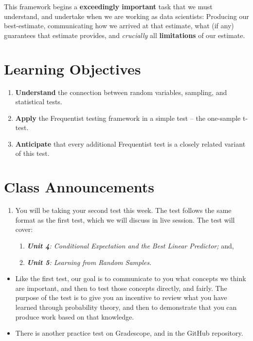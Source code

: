 \documentclass[
]{book}
\providecommand{\tightlist}{%
  \setlength{\itemsep}{0pt}\setlength{\parskip}{0pt}}
\theoremstyle{definition}
\theoremstyle{definition}
\theoremstyle{definition}
\theoremstyle{definition}
\theoremstyle{remark}
\begin{document}
This framework begins a \textbf{exceedingly important} task that we must understand, and undertake when we are working as data scientists: Producing our best-estimate, communicating how we arrived at that estimate, what (if any) guarantees that estimate provides, and \emph{crucially} all \textbf{limitations} of our estimate.

\hypertarget{learning-objectives-5}{%
\section{Learning Objectives}\label{learning-objectives-5}}

\begin{enumerate}
\def\labelenumi{\arabic{enumi}.}
\tightlist
\item
  \textbf{Understand} the connection between random variables, sampling, and statistical tests.
\item
  \textbf{Apply} the Frequentist testing framework in a simple test -- the one-sample t-test.
\item
  \textbf{Anticipate} that every additional Frequentist test is a closely related variant of this test.
\end{enumerate}

\hypertarget{class-announcements-4}{%
\section{Class Announcements}\label{class-announcements-4}}

\begin{enumerate}
\def\labelenumi{\arabic{enumi}.}
\tightlist
\item
  You will be taking your second test this week. The test follows the same format as the first test, which we will discuss in live session. The test will cover:

  \begin{enumerate}
  \def\labelenumii{\arabic{enumii}.}
  \item
    \emph{\textbf{Unit 4}: Conditional Expectation and the Best Linear Predictor;} and,
  \item
    \emph{\textbf{Unit 5}: Learning from Random Samples.}
  \end{enumerate}
\end{enumerate}

\begin{itemize}
\tightlist
\item
  Like the first test, our goal is to communicate to you what concepts we think are important, and then to test those concepts directly, and fairly. The purpose of the test is to give you an incentive to review what you have learned through probability theory, and then to demonstrate that you can produce work based on that knowledge.
\item
  There is another practice test on Gradescope, and in the GitHub repository.
\end{itemize}
\end{document}
